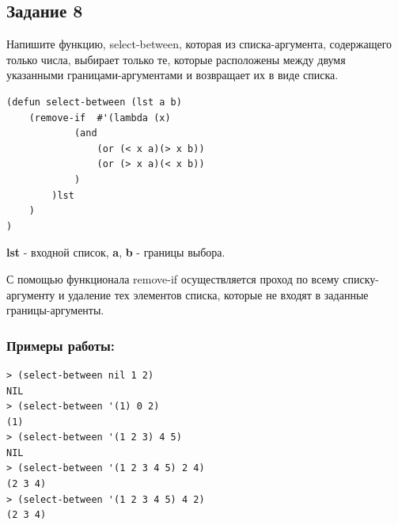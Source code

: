 \subsection*{Задание 8}

Напишите функцию, select-between, которая из списка-аргумента, содержащего только числа, выбирает только те, которые расположены между двумя указанными границами-аргументами и возвращает их в виде списка.

\begin{lstlisting}[caption=Функция выборки из списка по границам]
(defun select-between (lst a b)
	(remove-if	#'(lambda (x) 
			(and 
				(or (< x a)(> x b)) 
				(or (> x a)(< x b))
			)
		)lst
	)
)
\end{lstlisting}
\textbf{lst} -  входной список, \textbf{a}, \textbf{b}  -  границы выбора.

С помощью функционала remove-if осуществляется проход по всему списку-аргументу и удаление тех элементов списка, которые не входят в заданные границы-аргументы.

\subsubsection*{Примеры работы:}
\begin{lstlisting}
> (select-between nil 1 2)
NIL
> (select-between '(1) 0 2)
(1)
> (select-between '(1 2 3) 4 5)
NIL
> (select-between '(1 2 3 4 5) 2 4)
(2 3 4)
> (select-between '(1 2 3 4 5) 4 2)
(2 3 4)
\end{lstlisting}

